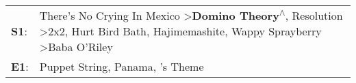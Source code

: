 \begin{supertabular}{p{0.03\textwidth}p{0.92\textwidth}}
 \textbf{S1}:  &  There's No Crying In Mexico\textsuperscript{} \textgreater \enspace \textbf{Domino Theory\textsuperscript{$\wedge$}}, \enspace Resolution\textsuperscript{} \textgreater \enspace 2x2\textsuperscript{}, \enspace Hurt Bird Bath\textsuperscript{}, \enspace Hajimemashite\textsuperscript{}, \enspace Wappy Sprayberry\textsuperscript{} \textgreater \enspace Baba O'Riley\textsuperscript{}  \enspace  \\
 \textbf{E1}:  &                                                                                                                                                                                                                                                                                       Puppet String\textsuperscript{}, \enspace Panama\textsuperscript{}, 's Theme\textsuperscript{}  \enspace  \\
\end{supertabular}
